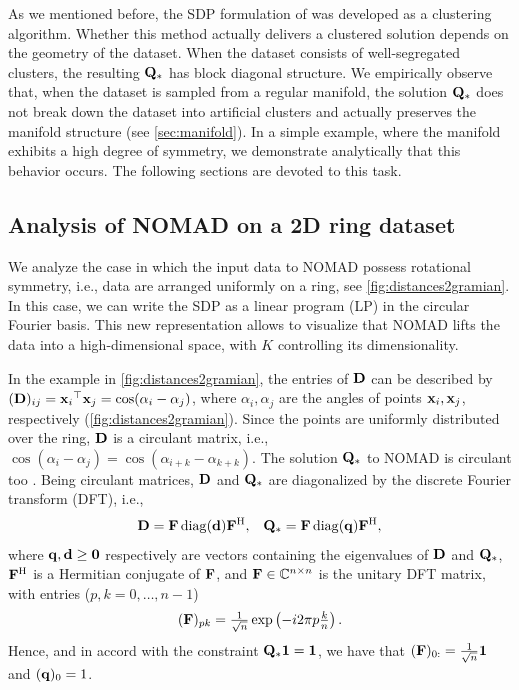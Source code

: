 \documentclass[twoside,11pt]{article}
\begin{document}
As we mentioned before, the SDP formulation of \citet{Peng2007_sdk-kmeans} was developed as a clustering algorithm. Whether this method actually delivers a clustered solution depends on the geometry of the dataset. When the dataset consists of well-segregated  clusters, the resulting ${\mathbf{Q}}_*$ has block diagonal structure. We empirically observe that, when the dataset is sampled from a regular manifold, the solution ${\mathbf{Q}}_*$ does not break down the dataset into artificial clusters and actually preserves the manifold structure (see \cref{sec:manifold}). In a simple example, where the manifold exhibits a high degree of symmetry, we demonstrate analytically that this behavior occurs. The following sections are devoted to this task.

\subsection{Analysis of NOMAD on a 2D ring dataset}


We analyze the case in which  the input data to NOMAD possess rotational symmetry, i.e., data are arranged uniformly on a ring, see \cref{fig:distances2gramian}.
In this case, we can write the SDP as a linear program (LP) in the circular Fourier basis. This new representation allows to visualize that NOMAD lifts the data into a high-dimensional space, with $K$ controlling its dimensionality.

In the example in \cref{fig:distances2gramian}, the entries of ${\mathbf{D}}$ can be described by
$({\mathbf{D}})_{ij} = {{\mathbf{x}}_i}^\top {\mathbf{x}}_j = \cos(\alpha_i - \alpha_j)$,
where $\alpha_i, \alpha_j$ are the angles of points ${\mathbf{x}}_i, {\mathbf{x}}_j$, respectively (\cref{fig:distances2gramian}). Since the points are uniformly distributed over the ring, ${\mathbf{D}}$ is a circulant matrix, i.e.,  $\cos(\alpha_i - \alpha_j) = \cos(\alpha_{i+k} - \alpha_{k+k})$.
The solution ${\mathbf{Q}}_*$ to NOMAD is circulant too \citep{Bachoc2012}.
Being circulant matrices, ${\mathbf{D}}$ and ${\mathbf{Q}}_*$ are diagonalized by the discrete Fourier transform (DFT), i.e.,
\begin{align}
	{\mathbf{D}} = {\mathbf{F}} \operatorname{diag}({\mathbf{d}}) {{\mathbf{F}}}^\mathrm{H} ,
	&&
	{\mathbf{Q}}_* = {\mathbf{F}} \operatorname{diag}({\mathbf{q}}) {{\mathbf{F}}}^\mathrm{H} ,	
	\label{eq:fourier_expansion}
\end{align}
where ${\mathbf{q}} , {\mathbf{d}} \geq {\mathbf{0}}$ respectively are vectors containing the eigenvalues of ${\mathbf{D}}$ and ${\mathbf{Q}}_*$, ${{\mathbf{F}}}^\mathrm{H}$ is a Hermitian conjugate of ${\mathbf{F}}$, and ${\mathbf{F}} \in {\mathbb C}^{n \times n}$ is the unitary DFT matrix, with entries ($p,k = 0, \dots, n-1$)
\begin{equation}
	({\mathbf{F}})_{pk} = \tfrac{1}{\sqrt{n}} \exp \left( -i 2\pi p \tfrac{k}{n} \right) .
	\label{eq:fourier_matrix}
\end{equation}
Hence, and in accord with the constraint ${\mathbf{Q}}_* {\mathbf{1}} = {\mathbf{1}}$, we have that $({\mathbf{F}})_{0:} = \tfrac{1}{\sqrt{n}} {\mathbf{1}}$ and $({\mathbf{q}})_0 = 1$.
\end{document}
